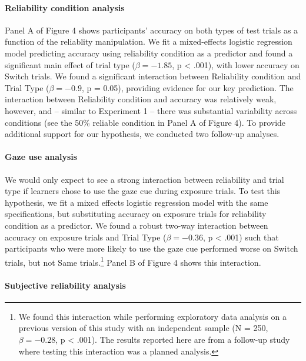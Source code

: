 \documentclass[a4paper,man,floatsintext]{apa6}
\begin{document}
\paragraph{Reliability condition
analysis}\label{reliability-condition-analysis}

Panel A of Figure 4 shows participants' accuracy on both types of test
trials as a function of the reliablity manipulation. We fit a
mixed-effects logistic regression model predicting accuracy using
reliability condition as a predictor and found a significant main effect
of trial type (\(\beta = -1.85\), p \textless{} .001), with lower
accuracy on Switch trials. We found a significant interaction between
Reliability condition and Trial Type (\(\beta = -0.9\), p = 0.05),
providing evidence for our key prediction. The interaction between
Reliability condition and accuracy was relatively weak, however, and --
similar to Experiment 1 -- there was substantial variability across
conditions (see the 50\% reliable condition in Panel A of Figure 4). To
provide additional support for our hypothesis, we conducted two
follow-up analyses.

\paragraph{Gaze use analysis}\label{gaze-use-analysis}

We would only expect to see a strong interaction between reliability and
trial type if learners chose to use the gaze cue during exposure trials.
To test this hypothesis, we fit a mixed effects logistic regression
model with the same specifications, but substituting accuracy on
exposure trials for reliability condition as a predictor. We found a
robust two-way interaction between accuracy on exposure trials and Trial
Type (\(\beta = -0.36\), p \textless{} .001) such that participants who
were more likely to use the gaze cue performed worse on Switch trials,
but not Same trials.\footnote{We found this interaction while performing
  exploratory data analysis on a previous version of this study with an
  independent sample (N = 250, \(\beta = -0.28\), p \textless{} .001).
  The results reported here are from a follow-up study where testing
  this interaction was a planned analysis.} Panel B of Figure 4 shows
this interaction.

\paragraph{Subjective reliability
analysis}\label{subjective-reliability-analysis}
\end{document}
